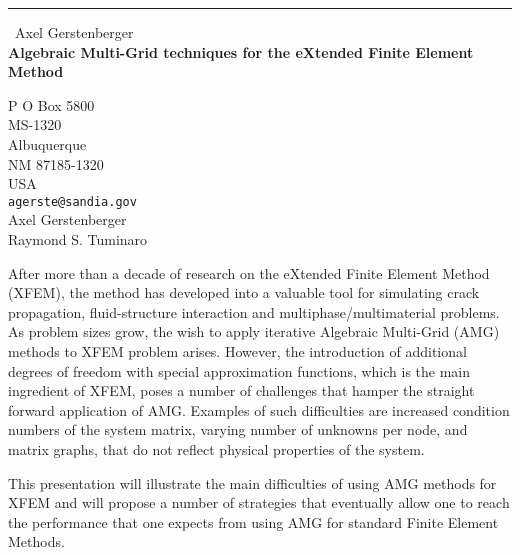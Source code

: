 \documentclass{report}
\begin{document}
\begin{center}
\rule{6in}{1pt} \
{\large Axel Gerstenberger \\
{\bf Algebraic Multi-Grid techniques for the eXtended Finite Element Method }}

P O Box 5800 \\ MS-1320 \\ Albuquerque \\ NM 87185-1320 \\ USA
\\
{\tt agerste@sandia.gov}\\
Axel Gerstenberger\\
Raymond S. Tuminaro\end{center}

After more than a decade of research on the eXtended Finite Element
Method (XFEM), the method has developed into a valuable tool for
simulating crack propagation, fluid-structure interaction and
multiphase/multimaterial problems. As problem sizes grow, the wish to
apply iterative Algebraic Multi-Grid (AMG) methods to XFEM problem
arises. However, the introduction of additional degrees of freedom with
special approximation functions, which is the main ingredient of XFEM,
poses a number of challenges that hamper the straight forward application
of AMG. Examples of such difficulties are increased condition numbers of
the system matrix, varying number of unknowns per node, and matrix
graphs, that do not reflect physical properties of the system.

This presentation will illustrate the main difficulties of using AMG
methods for XFEM and will propose a number of strategies that eventually
allow one to reach the performance that one expects from using AMG for
standard Finite Element Methods.
\end{document}
